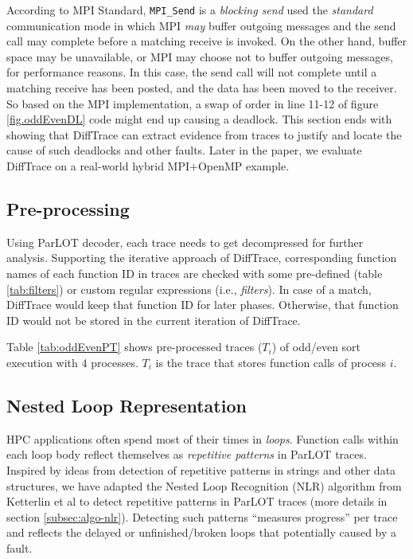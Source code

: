 According to MPI Standard, \texttt{MPI\_Send} is a \textit{blocking send} used the \textit{standard} communication mode in which MPI \textit{may} buffer outgoing messages and the send call may complete before a matching receive is invoked. On the other hand, buffer space may be unavailable, or MPI may choose not to buffer outgoing messages, for performance reasons. In this case, the send call will not complete until a matching receive has been posted, and the data has been moved to the receiver. So based on the MPI implementation, a swap of order in line 11-12 of figure \ref{fig.oddEvenDL} code might end up causing a deadlock. This section ends with showing that DiffTrace can extract evidence from traces to justify and locate the cause of such deadlocks and other faults. Later in the paper, we evaluate DiffTrace on a real-world hybrid MPI+OpenMP example.

\subsection{Pre-processing}

Using ParLOT decoder, each trace needs to get decompressed for further analysis.
Supporting the iterative approach of DiffTrace, corresponding function names of each function ID in traces are checked with some pre-defined (table \ref{tab:filters}) or custom regular expressions (i.e., \textit{filters}). In case of a match, DiffTrace would keep that function ID for later phases. Otherwise, that function ID would not be stored in the current iteration of DiffTrace.

Table \ref{tab:oddEvenPT} shows pre-processed traces ($T_i$) of odd/even sort execution with 4 processes. $T_i$ is the trace that stores function calls of process $i$.



\subsection{Nested Loop Representation}



HPC applications often spend most of their times in \textit{loops}. Function calls within each loop body reflect themselves as \textit{repetitive patterns} in ParLOT traces. Inspired by ideas from detection of repetitive patterns in strings \cite{nakamura_fast_2013} and other data structures\cite{kmr}, we have adapted the Nested Loop Recognition (NLR) algorithm from Ketterlin et al \cite{Ketterlin-nlr} to detect repetitive patterns in ParLOT traces (more details in section \ref{subsec:algo-nlr}). Detecting such patterns ``measures progress'' per trace and reflects the delayed or unfinished/broken loops that potentially caused by a fault.

